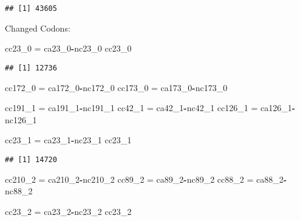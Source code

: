 \documentclass[
]{article}
\newenvironment{Shaded}{\begin{snugshade}}{\end{snugshade}}
\newcommand{\DecValTok}[1]{\textcolor[rgb]{0.00,0.00,0.81}{#1}}
\newcommand{\NormalTok}[1]{#1}
\newcommand{\OperatorTok}[1]{\textcolor[rgb]{0.81,0.36,0.00}{\textbf{#1}}}
\newcommand{\StringTok}[1]{\textcolor[rgb]{0.31,0.60,0.02}{#1}}
\begin{document}
\begin{verbatim}
## [1] 43605
\end{verbatim}

Changed Codons:

\begin{Shaded}
\begin{Highlighting}[]
\NormalTok{cc23_}\DecValTok{0}\NormalTok{ =}\StringTok{ }\NormalTok{ca23_}\DecValTok{0}\OperatorTok{-}\NormalTok{nc23_}\DecValTok{0}
\NormalTok{cc23_}\DecValTok{0}
\end{Highlighting}
\end{Shaded}

\begin{verbatim}
## [1] 12736
\end{verbatim}

\begin{Shaded}
\begin{Highlighting}[]
\NormalTok{cc172_}\DecValTok{0}\NormalTok{ =}\StringTok{ }\NormalTok{ca172_}\DecValTok{0}\OperatorTok{-}\NormalTok{nc172_}\DecValTok{0}
\NormalTok{cc173_}\DecValTok{0}\NormalTok{ =}\StringTok{ }\NormalTok{ca173_}\DecValTok{0}\OperatorTok{-}\NormalTok{nc173_}\DecValTok{0}

\NormalTok{cc191_}\DecValTok{1}\NormalTok{ =}\StringTok{ }\NormalTok{ca191_}\DecValTok{1}\OperatorTok{-}\NormalTok{nc191_}\DecValTok{1}
\NormalTok{cc42_}\DecValTok{1}\NormalTok{ =}\StringTok{ }\NormalTok{ca42_}\DecValTok{1}\OperatorTok{-}\NormalTok{nc42_}\DecValTok{1}
\NormalTok{cc126_}\DecValTok{1}\NormalTok{ =}\StringTok{ }\NormalTok{ca126_}\DecValTok{1}\OperatorTok{-}\NormalTok{nc126_}\DecValTok{1}

\NormalTok{cc23_}\DecValTok{1}\NormalTok{ =}\StringTok{ }\NormalTok{ca23_}\DecValTok{1}\OperatorTok{-}\NormalTok{nc23_}\DecValTok{1}
\NormalTok{cc23_}\DecValTok{1}
\end{Highlighting}
\end{Shaded}

\begin{verbatim}
## [1] 14720
\end{verbatim}

\begin{Shaded}
\begin{Highlighting}[]
\NormalTok{cc210_}\DecValTok{2}\NormalTok{ =}\StringTok{ }\NormalTok{ca210_}\DecValTok{2}\OperatorTok{-}\NormalTok{nc210_}\DecValTok{2}
\NormalTok{cc89_}\DecValTok{2}\NormalTok{ =}\StringTok{ }\NormalTok{ca89_}\DecValTok{2}\OperatorTok{-}\NormalTok{nc89_}\DecValTok{2}
\NormalTok{cc88_}\DecValTok{2}\NormalTok{ =}\StringTok{ }\NormalTok{ca88_}\DecValTok{2}\OperatorTok{-}\NormalTok{nc88_}\DecValTok{2}

\NormalTok{cc23_}\DecValTok{2}\NormalTok{ =}\StringTok{ }\NormalTok{ca23_}\DecValTok{2}\OperatorTok{-}\NormalTok{nc23_}\DecValTok{2}
\NormalTok{cc23_}\DecValTok{2}
\end{Highlighting}
\end{Shaded}
\end{document}
